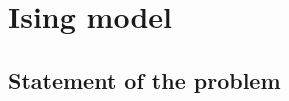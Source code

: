 \documentclass[hyperref={colorlinks=true}]{beamer}
\begin{document}
\section[Ising model]{Ising model}


\subsection[Statement of the problem]{Statement of the problem}
\end{document}

